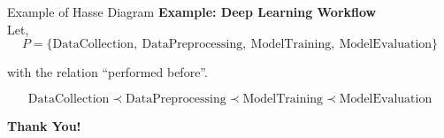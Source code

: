\documentclass{beamer}
\begin{document}
\begin{frame}{Example of Hasse Diagram}
\textbf{Example: Deep Learning Workflow}\\
Let,
\[
P=\{\text{DataCollection},\ \text{DataPreprocessing},\ \text{ModelTraining},\ \text{ModelEvaluation}\}
\]

with the relation ``performed before''.

\[
\text{DataCollection}
\prec
\text{DataPreprocessing}
\prec
\text{ModelTraining}
\prec
\text{ModelEvaluation}
\]

\begin{center}
\end{center}

\end{frame}

\begin{frame}
    \centering
    \vfill
    {\Huge \textbf{Thank You!}}
    \vfill
\end{frame}
\end{document}
